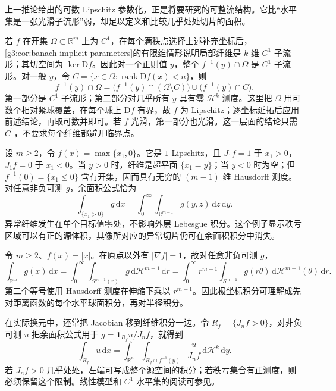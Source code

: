 上一推论给出的可数 Lipschitz 参数化，正是将要研究的可整流结构。它比“水平集是一张光滑子流形”弱，却足以定义和比较几乎处处切片的面积。

\ProseParagraphBreak

若 \(f\) 在开集 \(\Omega\subset\mathbb R^m\) 上为 \(C^1\)，在每个满秩点选择上述补充坐标后，\cref{g3:cor:banach-implicit-parameters}的有限维情形说明局部纤维是 \(k\) 维 \(C^1\) 子流形；其切空间为 \(\ker\mathrm Df\)。因此对一个正则值 \(y\)，整个 \(f^{-1}(y)\cap\Omega\) 是 \(C^1\) 子流形。对一般 \(y\)，令 \(C=\{x\in\Omega:\operatorname{rank}\mathrm Df(x)<n\}\)，则
\[
	f^{-1}(y)\cap\Omega
	=\bigl(f^{-1}(y)\cap(\Omega\setminus C)\bigr)
	\cup\bigl(f^{-1}(y)\cap C\bigr).
\]
第一部分是 \(C^1\) 子流形；第二部分对几乎所有 \(y\) 具有零 \(\mathcal H^k\) 测度。这里把 \(\Omega\) 用可数个相对紧球覆盖，在每个球上 \(\mathrm Df\) 有界，故 \(f\) 为 Lipschitz；逐坐标延拓后应用前述结论，再取可数并即可。若 \(f\) 光滑，第一部分也光滑。这一层面的结论只需 \(C^1\)，不要求每个纤维都避开临界点。

\begin{example}\label{g3:exm:coarea-exceptional-fiber}
	设 \(m\ge2\)，令 \(f(x)=\max\{x_1,0\}\)。它是 \(1\)-Lipschitz，且 \(J_1f=1\) 于 \(x_1>0\)，\(J_1f=0\) 于 \(x_1<0\)。当 \(y>0\) 时，纤维是超平面 \(\{x_1=y\}\)；当 \(y<0\) 时为空；但 \(f^{-1}(0)=\{x_1\le0\}\) 含有开集，因而具有无穷的 \((m-1)\) 维 Hausdorff 测度。对任意非负可测 \(g\)，余面积公式恰为
	\[
		\int_{\{x_1>0\}}g\,\mathrm dx
		=\int_0^\infty\int_{\mathbb R^{m-1}}g(y,z)\,\mathrm dz\,\mathrm dy.
	\]
	异常纤维发生在单个目标值零处，不影响外层 Lebesgue 积分。这个例子显示秩亏区域可以有正的源体积，其像所对应的异常切片仍可在余面积积分中消失。
\end{example}

\begin{example}\label{g3:exm:coarea-polar-integration}
	令 \(m\ge2\)、\(f(x)=|x|\)。在原点以外有 \(|\nabla f|=1\)，故对任意非负可测 \(g\)，
	\[
		\int_{\mathbb R^m}g(x)\,\mathrm dx
		=\int_0^\infty\int_{S^{m-1}(r)}g\,\mathrm d\mathcal H^{m-1}\,\mathrm dr
		=\int_0^\infty r^{m-1}\int_{S^{m-1}}g(r\theta)\,\mathrm d\mathcal H^{m-1}(\theta)\,\mathrm dr.
	\]
	第二个等号使用 Hausdorff 测度在伸缩下乘以 \(r^{m-1}\)。因此极坐标积分可理解成先对距离函数的每个水平球面积分，再对半径积分。
\end{example}

在实际换元中，还常把 Jacobian 移到纤维积分一边。令 \(R_f=\{J_nf>0\}\)，对非负可测 \(u\) 把余面积公式用于 \(g=\mathbf1_{R_f}u/J_nf\)，就得到
\[
	\int_{R_f}u\,\mathrm dx
	=\int_{\mathbb R^n}\int_{R_f\cap f^{-1}(y)}\frac{u}{J_nf}\,\mathrm d\mathcal H^k\,\mathrm dy.
\]
若 \(J_nf>0\) 几乎处处，左端可写成整个源空间的积分；若秩亏集合有正测度，则必须保留这个限制。线性模型和 \(C^1\) 水平集的阅读可参见\cite[第10节，式10.1--10.6，第53--56页]{Simon1983}。
